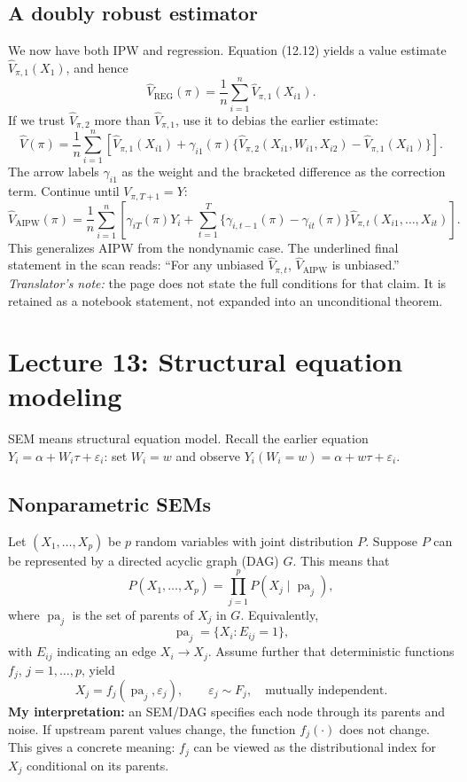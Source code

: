 \subsection{A doubly robust estimator}
We now have both IPW and regression. Equation (12.12) yields a value estimate $\widehat V_{\pi,1}(X_1)$, and hence
\[
 \widehat V_{\mathrm{REG}}(\pi)=\frac1n\sum_{i=1}^n\widehat V_{\pi,1}(X_{i1}).
\]
If we trust $\widehat V_{\pi,2}$ more than $\widehat V_{\pi,1}$, use it to debias the earlier estimate:
\[
 \widehat V(\pi)=\frac1n\sum_{i=1}^n\left[
 \widehat V_{\pi,1}(X_{i1})+
 \gamma_{i1}(\pi)\{
 \widehat V_{\pi,2}(X_{i1},W_{i1},X_{i2})
 -\widehat V_{\pi,1}(X_{i1})\}\right].
\]
The arrow labels $\gamma_{i1}$ as the weight and the bracketed difference as the correction term. Continue until $V_{\pi,T+1}=Y$:
\[
 \widehat V_{\mathrm{AIPW}}(\pi)
 =\frac1n\sum_{i=1}^n\left[
 \gamma_{iT}(\pi)Y_i+
 \sum_{t=1}^T\{\gamma_{i,t-1}(\pi)-\gamma_{it}(\pi)\}
 \widehat V_{\pi,t}(X_{i1},\ldots,X_{it})\right].
\]
This generalizes AIPW from the nondynamic case. The underlined final statement in the scan reads: ``For any unbiased $\widehat V_{\pi,t}$, $\widehat V_{\mathrm{AIPW}}$ is unbiased.'' \textit{Translator's note:} the page does not state the full conditions for that claim. It is retained as a notebook statement, not expanded into an unconditional theorem.

\section{Lecture 13: Structural equation modeling}
SEM means structural equation model. Recall the earlier equation $Y_i=\alpha+W_i\tau+\varepsilon_i$: set $W_i=w$ and observe $Y_i(W_i=w)=\alpha+w\tau+\varepsilon_i$.

\subsection{Nonparametric SEMs}
Let $(X_1,\ldots,X_p)$ be $p$ random variables with joint distribution $P$. Suppose $P$ can be represented by a directed acyclic graph (DAG) $G$. This means that
\[
 P(X_1,\ldots,X_p)=\prod_{j=1}^p P(X_j\mid\operatorname{pa}_j),\tag{13.2}
\]
where $\operatorname{pa}_j$ is the set of parents of $X_j$ in $G$. Equivalently,
\[
 \operatorname{pa}_j=\{X_i:E_{ij}=1\},
\]
with $E_{ij}$ indicating an edge $X_i\to X_j$. Assume further that deterministic functions $f_j$, $j=1,\ldots,p$, yield
\[
 X_j=f_j(\operatorname{pa}_j,\varepsilon_j),\qquad
 \varepsilon_j\sim F_j,\quad\text{mutually independent}.\tag{13.3}
\]
\textbf{My interpretation:} an SEM/DAG specifies each node through its parents and noise. If upstream parent values change, the function $f_j(\cdot)$ does not change. This gives a concrete meaning: $f_j$ can be viewed as the distributional index for $X_j$ conditional on its parents.

